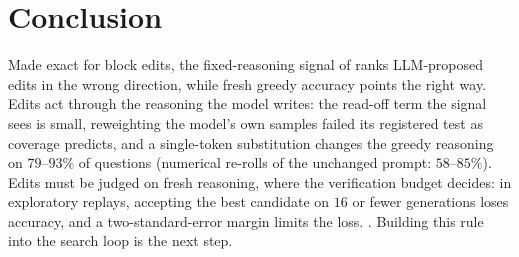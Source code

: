 \section{Conclusion}
\label{sec:conclusion}

Made exact for block edits, the fixed-reasoning signal of \greater{} ranks LLM-proposed edits in
the wrong direction, while fresh greedy accuracy points the right way. Edits act through the
reasoning the model writes: the read-off term the signal sees is small, reweighting the model's own
samples failed its registered test as coverage predicts, and a single-token substitution changes the
greedy reasoning on $79$--$93\%$ of questions (numerical re-rolls of the unchanged prompt:
$58$--$85\%$). Edits must be judged on fresh reasoning, where the verification budget
decides: in exploratory replays, accepting the best candidate on $16$ or fewer generations loses
accuracy, and a two-standard-error margin limits the loss. . Building this rule into the search
loop is the next step.
\label{mainend}%
